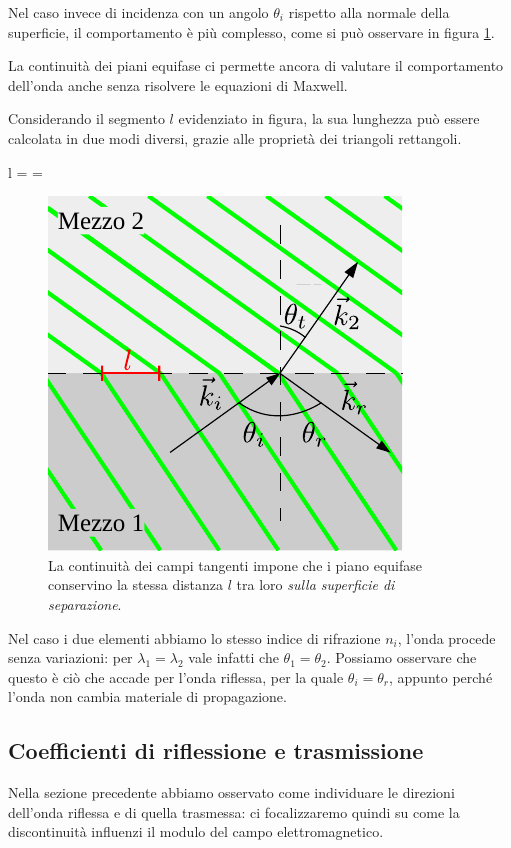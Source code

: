 	Nel caso invece di incidenza con un angolo $\theta_i$ rispetto alla normale della superficie, il comportamento è più complesso, come si può osservare in figura \ref{fig:incidenza_non_normale_isolanti}.

	La continuità dei piani equifase ci permette ancora di valutare il comportamento dell'onda anche senza risolvere le equazioni di Maxwell.

	Considerando il segmento $l$ evidenziato in figura, la sua lunghezza può essere calcolata in due modi diversi, grazie alle proprietà dei triangoli rettangoli.

	\begin{esp} \label{eq:legge_di_schnell}
		l =  = 
	\end{esp}

	\begin{figure}[ht]
		\centering
		\includegraphics{img/incidenza_non_normale.pdf}
		\caption{La continuità dei campi tangenti impone che i piano equifase conservino la stessa distanza $l$ tra loro \emph{sulla superficie di separazione}.}
		\label{fig:incidenza_non_normale_isolanti}
	\end{figure}

	Nel caso i due elementi abbiamo lo stesso indice di rifrazione $n_i$, l'onda procede senza variazioni: per $\lambda_1 = \lambda_2$ vale infatti che $\theta_1 = \theta_2$.
	Possiamo osservare che questo è ciò che accade per l'onda riflessa, per la quale $\theta_i = \theta_r$, appunto perché l'onda non cambia materiale di propagazione.

\subsection{Coefficienti di riflessione e trasmissione}
	Nella sezione precedente abbiamo osservato come individuare le direzioni dell'onda riflessa e di quella trasmessa: ci focalizzaremo quindi su come la discontinuità influenzi il modulo del campo elettromagnetico.

